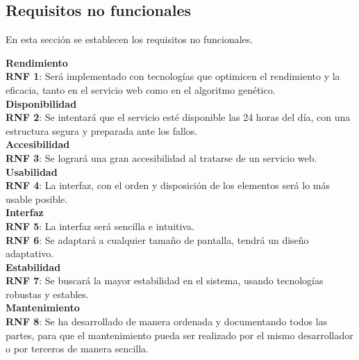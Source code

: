 \bigskip
\subsection{Requisitos no funcionales}

\bigskip
En esta sección se establecen los requisitos no funcionales.

\bigskip
\textbf{Rendimiento}\\

\textbf{RNF 1}: Será implementado con tecnologías que optimicen el rendimiento y la eficacia, tanto en el servicio web como en el algoritmo genético.\\

\textbf{Disponibilidad}\\

\textbf{RNF 2}: Se intentará que el servicio esté disponible las 24 horas del día, con una estructura segura y preparada ante los fallos.\\


\textbf{Accesibilidad}\\

\textbf{RNF 3}: Se logrará una gran accesibilidad al tratarse de un servicio web.\\


\textbf{Usabilidad}\\

\textbf{RNF 4}: La interfaz, con el orden y disposición de los elementos será lo más usable posible.\\

\textbf{Interfaz}\\

\textbf{RNF 5}: La interfaz será sencilla e intuitiva.\\

\textbf{RNF 6}: Se adaptará a cualquier tamaño de pantalla, tendrá un diseño adaptativo.\\


\textbf{Estabilidad}\\

\textbf{RNF 7}: Se buscará la mayor estabilidad en el sistema, usando tecnologías robustas y estables.\\


\textbf{Mantenimiento}\\

\textbf{RNF 8}: Se ha desarrollado de manera ordenada y documentando todos las partes, para que el mantenimiento pueda ser realizado por el mismo desarrollador o por terceros de manera sencilla.\\


